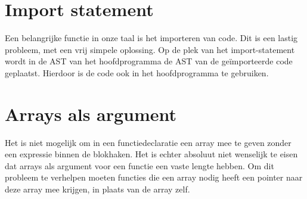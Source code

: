 
\section{Import statement} %
\label{sec:import_statement}
Een belangrijke functie in onze taal is het importeren van code. Dit is een lastig probleem, met een vrij simpele oplossing. Op de plek van het import-statement wordt in de AST van het hoofdprogramma de AST van de ge\"importeerde code geplaatst. Hierdoor is de code ook in het hoofdprogramma te gebruiken.

\section{Arrays als argument} %
\label{sec:arrays_als_argument}
Het is niet mogelijk om in een functiedeclaratie een array mee te geven zonder een expressie binnen de blokhaken. Het is echter absoluut niet wenselijk te eisen dat arrays als argument voor een functie een vaste lengte hebben. Om dit probleem te verhelpen moeten functies die een array nodig heeft een pointer naar deze array mee krijgen, in plaats van de array zelf.

\clearpage